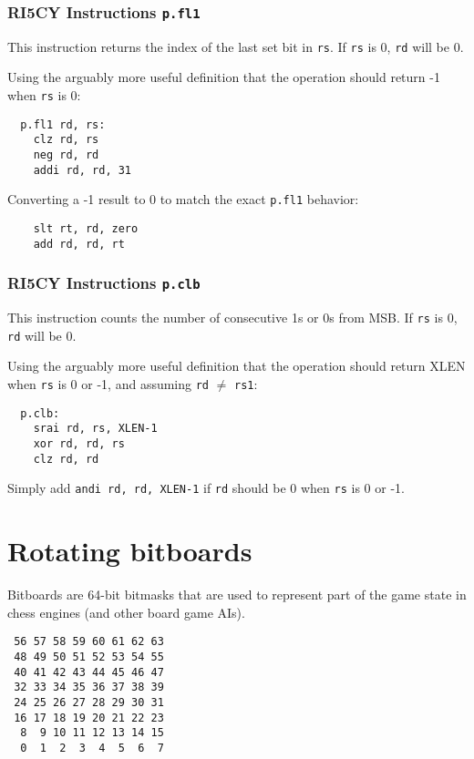 \subsubsection{RI5CY Instructions {\tt p.fl1}}

This instruction returns the index of the last set bit in {\tt rs}. If {\tt rs} is 0, {\tt rd} will be 0.

Using the arguably more useful definition that the operation should return -1 when {\tt rs} is 0:

\begin{verbatim}
  p.fl1 rd, rs:
    clz rd, rs
    neg rd, rd
    addi rd, rd, 31
\end{verbatim}

Converting a -1 result to 0 to match the exact {\tt p.fl1} behavior:

\begin{verbatim}
    slt rt, rd, zero
    add rd, rd, rt
\end{verbatim}

\subsubsection{RI5CY Instructions {\tt p.clb}}

This instruction counts the number of consecutive 1s or 0s from MSB. If {\tt rs} is 0, {\tt rd} will be 0.

Using the arguably more useful definition that the operation should return XLEN when {\tt rs} is 0 or -1,
and assuming {\tt rd} $\ne$ {\tt rs1}:

\begin{verbatim}
  p.clb:
    srai rd, rs, XLEN-1
    xor rd, rd, rs
    clz rd, rd
\end{verbatim}

Simply add {\tt andi rd, rd, XLEN-1} if {\tt rd} should be 0 when {\tt rs} is 0 or -1.

\section{Rotating bitboards}

Bitboards are 64-bit bitmasks that are used to represent part of the game state
in chess engines (and other board game AIs).

\begin{verbatim}
 56 57 58 59 60 61 62 63
 48 49 50 51 52 53 54 55
 40 41 42 43 44 45 46 47
 32 33 34 35 36 37 38 39
 24 25 26 27 28 29 30 31
 16 17 18 19 20 21 22 23
  8  9 10 11 12 13 14 15
  0  1  2  3  4  5  6  7
\end{verbatim}

